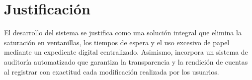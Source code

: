 \section{Justificación}

El desarrollo del sistema se justifica como una solución integral que elimina la saturación en ventanillas, los tiempos de espera y el uso excesivo de papel mediante un expediente digital centralizado. Asimismo, incorpora un sistema de auditoría automatizado que garantiza la transparencia y la rendición de cuentas al registrar con exactitud cada modificación realizada por los usuarios.
